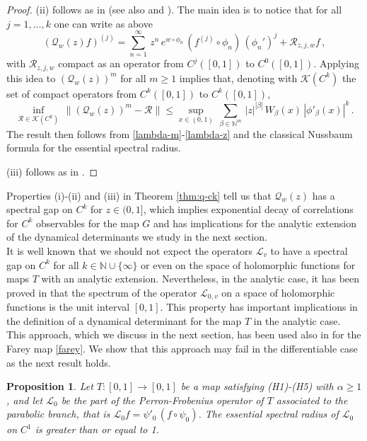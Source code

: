 \documentclass[11pt]{amsart}
\newtheorem{proposition}[theorem]{Proposition}
\theoremstyle{definition}
\theoremstyle{remark}
\theoremstyle{definition}
\numberwithin{equation}{section}
\newcommand{\N}{\mathbb N}
\newcommand{\LL}{\mathcal{L}}
\newcommand{\QQ}{\mathcal{Q}}
\newcommand{\KK}{\mathcal{K}}
\newcommand{\RR}{\mathcal{R}}
\begin{document}
\begin{proof}
(ii) follows as in \cite[Thm. 3.1]{kalle} (see also \cite[Thm. 6]{CI} and \cite[Thm. 2.5]{bal-book-1}). The main idea is to notice that for all $j=1,\dots,k$ one can write as above
\[
(\QQ_w(z)f)^{(j)} = \sum_{n=1}^\infty\, z^n\, e^{w\circ \phi_n}\, (f^{(j)}\circ \phi_n)\, (\phi_n')^j + \RR_{z,j,w} f\, ,
\]
with $\RR_{z,j,w}$ compact as an operator from $C^j([0,1])$ to $C^0([0,1])$. Applying this idea to $(\QQ_w(z))^m$ for all $m\ge 1$ implies that, denoting with $\KK(C^k)$ the set of compact operators from $C^k([0,1])$ to $C^k([0,1])$,
\[
\inf_{\RR \in \KK(C^k)}\, \| (\QQ_w(z))^m - \RR \| \le \sup_{x\in (0,1)}\, \sum_{\beta \in \N^m}\, |z|^{|\beta|}\, W_\beta(x)\, |\phi'_\beta(x)|^k\, .
\]
The result then follows from \eqref{lambda-m}-\eqref{lambda-z} and the classical Nussbaum formula for the essential spectral radius.

(iii) follows as in \cite[Thm. 3.1]{Is2}. 
\end{proof}

Properties (i)-(ii) and (iii) in Theorem \ref{thm:q-ck} tell us that $\QQ_w(z)$ has a spectral gap on $C^k$ for $z\in (0,1]$, which implies exponential decay of correlations for $C^k$ observables for the map $G$ and has implications for the analytic extension of the dynamical determinants we study in the next section. \\

It is well known that we should not expect the operators $\LL_v$ to have a spectral gap on $C^k$ for all $k\in \N \cup \{\infty\}$ or even on the space of holomorphic functions for maps $T$ with an analytic extension. Nevertheless, in the analytic case, it has been proved in \cite{Ru} that the spectrum of the operator $\LL_{0,v}$ on a space of holomorphic functions is the unit interval $[0,1]$. This property has important implications in the definition of a dynamical determinant for the map $T$ in the analytic case. This approach, which we discuss in the next section, has been used also in \cite{Is1,BI} for the Farey map \eqref{farey}. We show that this approach may fail in the differentiable case as the next result holds.

\begin{proposition}\label{prop:l0-spec}
Let $T:[0,1]\to [0,1]$ be a map satisfying (H1)-(H5) with $\alpha\ge 1$, and let $\LL_0$ be the part of the Perron-Frobenius operator of $T$ associated to the parabolic branch, that is $\LL_0 f = \psi'_0 \, (f\circ \psi_0)$. The essential spectral radius of $\LL_0$ on $C^1$ is greater than or equal to 1.
\end{proposition}
\end{document}
